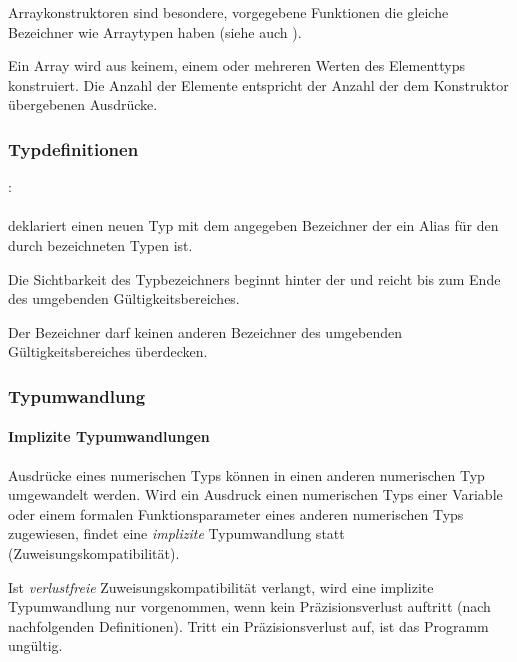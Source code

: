 
Arraykonstruktoren sind besondere, vorgegebene Funktionen die gleiche Bezeichner wie Arraytypen haben
(siehe auch ).

Ein Array wird aus keinem, einem oder mehreren Werten des Elementtyps konstruiert.
Die Anzahl der Elemente entspricht der Anzahl der dem Konstruktor übergebenen Ausdrücke.

\subsubsection{Typdefinitionen}\label{Typdefinitionen}
:\label{typ_definition}\\
\hspace*{1cm}\glq{}\grq  {}   \\

 deklariert einen neuen Typ mit dem angegeben Bezeichner der ein Alias für den durch \glq{}\grq bezeichneten Typen ist.

Die Sichtbarkeit des Typbezeichners beginnt hinter der 
und reicht bis zum Ende des umgebenden Gültigkeitsbereiches.

Der Bezeichner darf keinen anderen Bezeichner des umgebenden Gültigkeitsbereiches überdecken.


\subsubsection{Typumwandlung}\label{Typumwandlung}

\paragraph{{Implizite Typumwandlungen}}\label{__Implizite Typumwandlungen__}
Ausdrücke eines numerischen Typs können in einen anderen numerischen Typ umgewandelt werden.
Wird ein Ausdruck einen numerischen Typs einer Variable oder einem formalen Funktionsparameter
eines anderen numerischen Typs zugewiesen, findet eine \emph{implizite} Typumwandlung statt
(Zuweisungskompatibilität).

Ist \emph{verlustfreie} Zuweisungskompatibilität verlangt, wird eine implizite Typumwandlung nur
vorgenommen, wenn kein Präzisionsverlust auftritt (nach nachfolgenden Definitionen). Tritt ein
Präzisionsverlust auf, ist das Programm ungültig.

